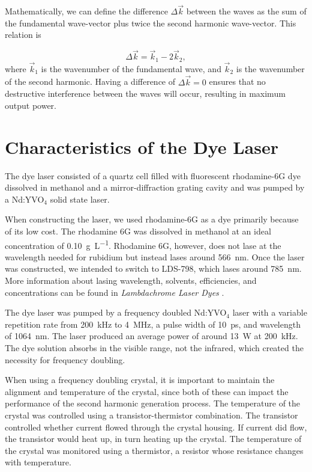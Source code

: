 Mathematically, we can define the difference $\Delta \vec k$ between the waves as the sum of the fundamental wave-vector plus twice the second harmonic wave-vector. This relation is

\begin{equation}
  \Delta \vec k = \vec k_1 - 2 \vec k_2,
  \label{phasematching}
\end{equation}
%
where $\vec k_1$ is the wavenumber of the fundamental wave, and $\vec k_2$ is the wavenumber of the second harmonic. Having a difference of $\Delta \vec k = 0$ ensures that no destructive interference between the waves will occur, resulting in maximum output power.

\section{Characteristics of the Dye Laser}

The dye laser consisted of a quartz cell filled with fluorescent rhodamine-6G dye dissolved in methanol and a mirror-diffraction grating cavity and was pumped by a Nd:YVO$_4$ solid state laser.

When constructing the laser, we used rhodamine-6G as a dye primarily because of its low cost. The rhodamine 6G was dissolved in methanol at an ideal concentration of \SI{0.10}{\gram \per \liter}. Rhodamine 6G, however, does not lase at the wavelength needed for rubidium but instead lases around \SI{566}{\nano \meter}. Once the laser was constructed, we intended to switch to LDS-798, which lases around \SI{785}{\nano \meter}. More information about lasing wavelength, solvents, efficiencies, and concentrations can be found in \textit{Lambdachrome Laser Dyes} \cite{Brackmann2000}.

The dye laser was pumped by a frequency doubled Nd:YVO$_4$ laser with a variable repetition rate from \SI{200}{ kHz} to \SI{4}{ MHz}, a pulse width of \SI{10}{\pico \second}, and wavelength of \SI{1064}{\nano \meter}. The laser produced an average power of around \SI{13}{W} at \SI{200}{\kilo Hz}. The dye solution  absorbs in the visible range, not the infrared, which created the necessity for frequency doubling.

When using a frequency doubling crystal, it is important to maintain the alignment and temperature of the crystal, since both of these can impact the performance of the second harmonic generation process. The temperature of the crystal was controlled using a transistor-thermistor combination. The transistor controlled whether current flowed through the crystal housing. If current did flow, the transistor would heat up, in turn heating up the crystal. The temperature of the crystal was monitored using a thermistor, a resistor whose resistance changes with temperature. 

